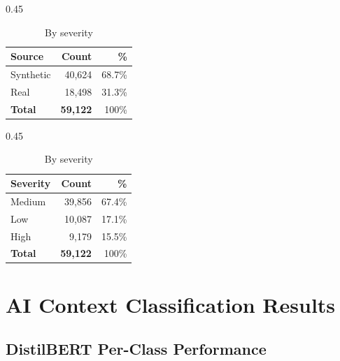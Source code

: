 \begin{table}[H]
  \centering
  \caption{Payload Dataset -- Source and Severity Distribution}
  \label{tab:payload_source}
  \begin{subtable}[t]{0.45\linewidth}
    \centering
    \begin{tabular}{lrr}
      \toprule
      \rowcolor{headblue}
      \textbf{Source} & \textbf{Count} & \textbf{\%} \\
      \midrule
      Synthetic & 40{,}624 & 68.7\% \\
      Real      & 18{,}498 & 31.3\% \\
      \midrule
      \textbf{Total} & \textbf{59{,}122} & 100\% \\
      \bottomrule
    \end{tabular}
    \caption{By source}
  \end{subtable}
  \hfill
  \begin{subtable}[t]{0.45\linewidth}
    \centering
    \begin{tabular}{lrr}
      \toprule
      \rowcolor{headblue}
      \textbf{Severity} & \textbf{Count} & \textbf{\%} \\
      \midrule
      Medium & 39{,}856 & 67.4\% \\
      Low    & 10{,}087 & 17.1\% \\
      High   &  9{,}179 & 15.5\% \\
      \midrule
      \textbf{Total} & \textbf{59{,}122} & 100\% \\
      \bottomrule
    \end{tabular}
    \caption{By severity}
    \label{tab:payload_severity}
  \end{subtable}
\end{table}
\section{AI Context Classification Results}
\label{sec:context_results}
 
\subsection{DistilBERT Per-Class Performance}
 

